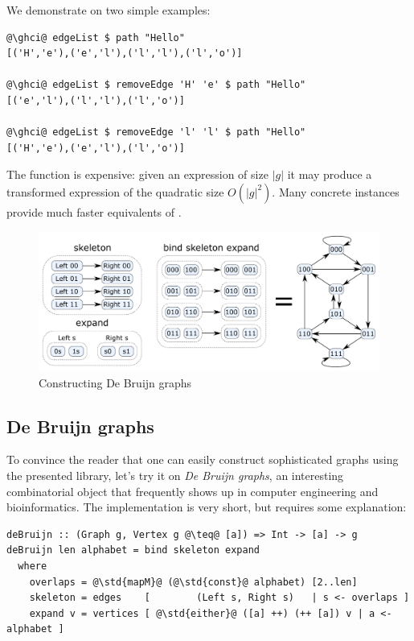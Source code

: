 We demonstrate  on two simple examples:
\begin{verbatim}
@\ghci@ edgeList $ path "Hello"
[('H','e'),('e','l'),('l','l'),('l','o')]

@\ghci@ edgeList $ removeEdge 'H' 'e' $ path "Hello"
[('e','l'),('l','l'),('l','o')]

@\ghci@ edgeList $ removeEdge 'l' 'l' $ path "Hello"
[('H','e'),('e','l'),('l','o')]
\end{verbatim}

\noindent
The  function is expensive: given an expression of size $|g|$
it may produce a transformed expression of the quadratic size $O(|g|^2)$. Many
concrete  instances provide much faster equivalents of .

\begin{figure}
\centerline{\includegraphics[scale=0.3]{fig/De-Bruijn-construction.pdf}}
\vspace{-4mm}
\caption{Constructing De Bruijn graphs\label{fig-de-bruijn}}
\vspace{-4mm}
\end{figure}


\subsection{De Bruijn graphs}

To convince the reader that one can easily construct sophisticated graphs using
the presented library, let's try it on \emph{De Bruijn graphs}, an interesting
combinatorial object that frequently shows up in computer engineering and
bioinformatics. The implementation is very short, but requires some explanation:

\begin{verbatim}
deBruijn :: (Graph g, Vertex g @\teq@ [a]) => Int -> [a] -> g
deBruijn len alphabet = bind skeleton expand
  where
    overlaps = @\std{mapM}@ (@\std{const}@ alphabet) [2..len]
    skeleton = edges    [        (Left s, Right s)   | s <- overlaps ]
    expand v = vertices [ @\std{either}@ ([a] ++) (++ [a]) v | a <- alphabet ]
\end{verbatim}

